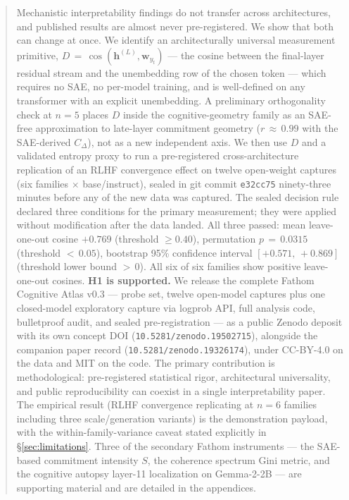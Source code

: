 \documentclass[11pt,letterpaper]{article}
\begin{document}
\begin{abstract}
Mechanistic interpretability findings do not transfer across architectures,
and published results are almost never pre-registered. We show that both
can change at once. We identify an architecturally universal measurement
primitive, $D\,=\,\cos(\mathbf{h}^{(L)},\mathbf{w}_{y_t})$ --- the cosine
between the final-layer residual stream and the unembedding row of the
chosen token --- which requires no SAE, no per-model training, and is
well-defined on any transformer with an explicit unembedding. A
preliminary orthogonality check at $n\!=\!5$ places $D$ inside the
cognitive-geometry family as an SAE-free approximation to late-layer
commitment geometry ($r\,\approx\,0.99$ with the SAE-derived $C_\Delta$),
not as a new independent axis. We then use $D$ and a validated entropy
proxy to run a pre-registered cross-architecture replication of an RLHF
convergence effect on twelve open-weight captures (six families
$\times$ base/instruct), sealed in git commit \texttt{e32cc75} ninety-three
minutes before any of the new data was captured. The sealed decision rule
declared three conditions for the primary measurement; they were applied
without modification after the data landed. All three passed: mean
leave-one-out cosine $+0.769$ (threshold $\geq 0.40$), permutation
$p\,=\,0.0315$ (threshold $<\,0.05$), bootstrap 95\% confidence interval
$[+0.571,\,+0.869]$ (threshold lower bound $>\,0$). All six of six
families show positive leave-one-out cosines. \textbf{H1 is supported.}
We release the complete Fathom Cognitive Atlas v0.3 --- probe set, twelve
open-model captures plus one closed-model exploratory capture via logprob
API, full analysis code, bulletproof audit, and sealed pre-registration
--- as a public Zenodo deposit with its own concept DOI
(\texttt{10.5281/zenodo.19502715}), alongside the companion paper record
(\texttt{10.5281/zenodo.19326174}), under CC-BY-4.0 on the data and MIT
on the code. The primary contribution is methodological: pre-registered
statistical rigor, architectural universality, and public reproducibility
can coexist in a single interpretability paper. The empirical result
(RLHF convergence replicating at $n\!=\!6$ families including three
scale/generation variants) is the demonstration payload, with the
within-family-variance caveat stated explicitly in
\S\ref{sec:limitations}. Three of the secondary Fathom instruments ---
the SAE-based commitment intensity $S$, the coherence spectrum Gini
metric, and the cognitive autopsy layer-11 localization on Gemma-2-2B ---
are supporting material and are detailed in the appendices.
\end{abstract}
\end{document}
